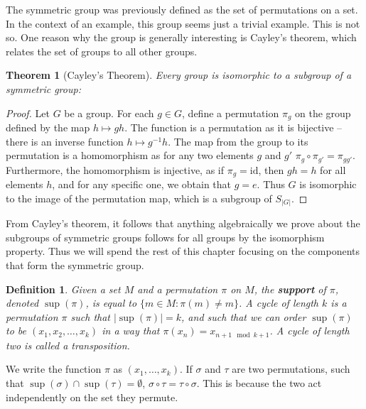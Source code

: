 \documentclass[12pt]{report}
\newtheorem{theorem}{Theorem}[section]
\newtheorem{definition}{Definition}
\begin{document}
The symmetric group was previously defined as the set of permutations on a set. In the context of an example, this group seems just a trivial example. This is not so. One reason why the group is generally interesting is Cayley's theorem, which relates the set of groups to all other groups.

\begin{theorem}[Cayley's Theorem]
    Every group is isomorphic to a subgroup of a symmetric group:
\end{theorem}
\begin{proof}
    Let $G$ be a group. For each $g \in G$, define a permutation $\pi_g$ on the group defined by the map $h \mapsto gh$. The function is a permutation as it is bijective -- there is an inverse function $h \mapsto g^{-1}h$. The map from the group to its permutation is a homomorphism as for any two elements $g$ and $g'$ $\pi_g \circ \pi_{g'} = \pi_{gg'}$. Furthermore, the homomorphism is injective, as if $\pi_g = \text{id}$, then $gh = h$ for all elements $h$, and for any specific one, we obtain that $g = e$. Thus $G$ is isomorphic to the image of the permutation map, which is a subgroup of $S_{|G|}$.
\end{proof}

From Cayley's theorem, it follows that anything algebraically we prove about the subgroups of symmetric groups follows for all groups by the isomorphism property. Thus we will spend the rest of this chapter focusing on the components that form the symmetric group.

\begin{definition}
    Given a set $M$ and a permutation $\pi$ on $M$, the {\bf support} of $\pi$, denoted $\sup(\pi)$, is equal to $\{ m \in M : \pi(m) \neq m \}$. A cycle of length $k$ is a permutation $\pi$ such that $|\sup(\pi)| = k$, and such that we can order $\sup(\pi)$ to be $(x_1, x_2, \dots, x_k)$ in a way that $\pi(x_n) = x_{n+1 \mod k+1}$. A cycle of length two is called a transposition.
\end{definition}

We write the function $\pi$ as $(x_1, \dots, x_k)$. If $\sigma$ and $\tau$ are two permutations, such that $\sup(\sigma) \cap \sup(\tau) = \emptyset$, $\sigma \circ \tau = \tau \circ \sigma$. This is because the two act independently on the set they permute.
\end{document}

